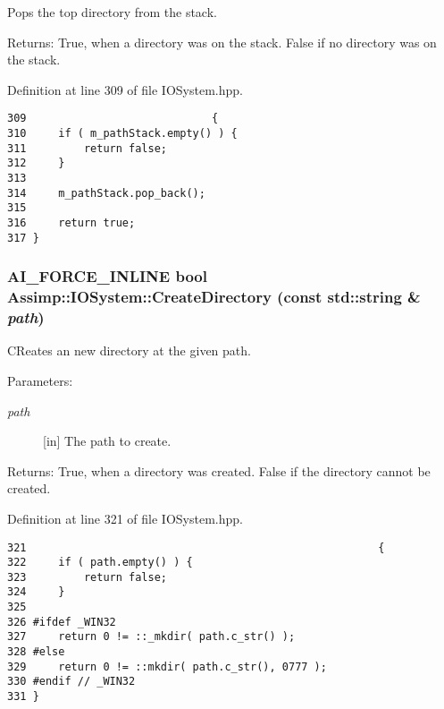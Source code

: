 Pops the top directory from the stack. 

\begin{Desc}
\item[Returns:]True, when a directory was on the stack. False if no directory was on the stack. \end{Desc}


Definition at line 309 of file IOSystem.hpp.

\begin{Code}\begin{verbatim}309                             {
310     if ( m_pathStack.empty() ) {
311         return false;
312     }
313 
314     m_pathStack.pop_back();
315 
316     return true;
317 }
\end{verbatim}
\end{Code}


\hypertarget{class_assimp_1_1_i_o_system_3fc1316fdb4168cde052c95f96364d41}{
\subsubsection[CreateDirectory]{\setlength{\rightskip}{0pt plus 5cm}AI\_\-FORCE\_\-INLINE bool Assimp::IOSystem::CreateDirectory (const std::string \& {\em path})}}
\label{class_assimp_1_1_i_o_system_3fc1316fdb4168cde052c95f96364d41}


CReates an new directory at the given path. 

\begin{Desc}
\item[Parameters:]
\begin{description}
\item[{\em path}]\mbox{[}in\mbox{]} The path to create. \end{description}
\end{Desc}
\begin{Desc}
\item[Returns:]True, when a directory was created. False if the directory cannot be created. \end{Desc}


Definition at line 321 of file IOSystem.hpp.

\begin{Code}\begin{verbatim}321                                                       {
322     if ( path.empty() ) {
323         return false;
324     }
325 
326 #ifdef _WIN32
327     return 0 != ::_mkdir( path.c_str() );
328 #else
329     return 0 != ::mkdir( path.c_str(), 0777 );
330 #endif // _WIN32
331 }
\end{verbatim}
\end{Code}


